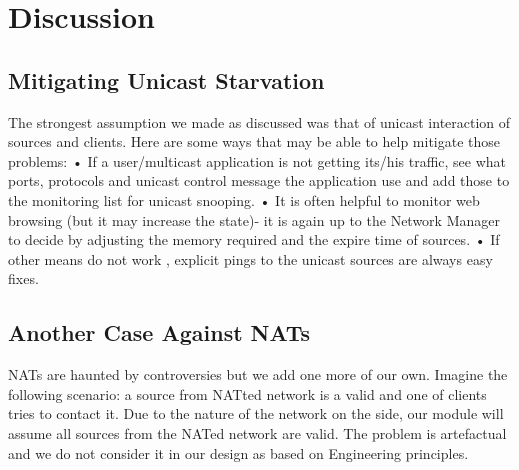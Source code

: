 \chapter{Discussion}
\section{Mitigating Unicast Starvation}
The strongest assumption we made as discussed was that of unicast interaction
of sources and clients. Here are some ways that may be able to help mitigate those
problems:
• If a user/multicast application is not getting its/his traffic, see what ports,
protocols and unicast control message the application use and add those
to the monitoring list for unicast snooping.
• It is often helpful to monitor web browsing (but it may increase the state)-
it is again up to the Network Manager to decide by adjusting the memory
required and the expire time of sources.
• If other means do not work , explicit pings to the unicast sources are
always easy fixes.
\section{Another Case Against NATs}
NATs are haunted by controversies but we add one more of our own. Imagine
the following scenario: a source from NATted network is a valid and one of clients
tries to contact it. Due to the nature of the network on the side, our module will
assume all sources from the NATed network are valid. The problem is artefactual
and we do not consider it in our design as based on Engineering principles.
